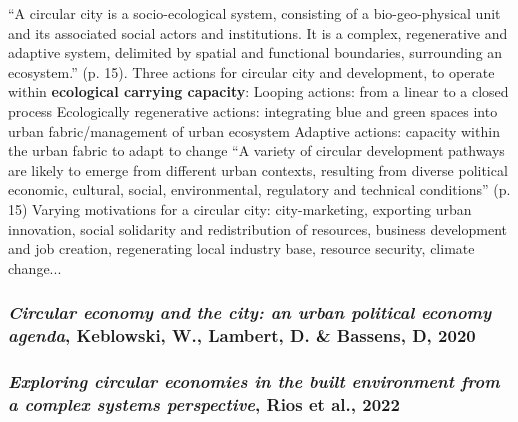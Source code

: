 \documentclass{article}
\begin{document}
\begin{outline}
	\1 ``A circular city is a socio-ecological system, consisting of a bio-geo-physical unit and its associated social actors and institutions. It is a complex, regenerative and adaptive system, delimited by spatial and functional boundaries, surrounding an ecosystem.'' (p. 15). Three actions for circular city and development, to operate within \textbf{ecological carrying capacity}:
		\2 Looping actions: from a linear to a closed process
		\2 Ecologically regenerative actions: integrating blue and green spaces into urban fabric/management of urban ecosystem
		\2 Adaptive actions: capacity within the urban fabric to adapt to change
	\1 ``A variety of circular development pathways are likely to emerge from different urban contexts, resulting from diverse political economic, cultural, social, environmental, regulatory and technical conditions'' (p. 15)
	\1 Varying motivations for a circular city: city-marketing, exporting urban innovation, social solidarity and redistribution of resources, business development and job creation, regenerating local industry base, resource security, climate change... 
\end{outline}

\subsubsection{\textit{Circular economy and the city: an urban political economy agenda}, Keblowski, W., Lambert, D. \& Bassens, D, 2020}

\begin{outline}
	\1 
\end{outline}

\subsubsection{\textit{Exploring circular economies in the built environment from a complex systems perspective}, Rios et al., 2022}
\end{document}
